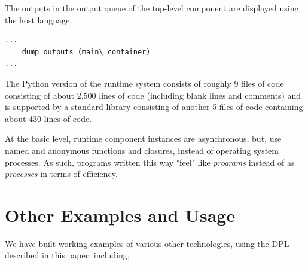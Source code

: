 \documentclass[10pt]{acmart}
\begin{document}
\begin{enumerate}
The outputs in the output queue of the top-level component are displayed
using the host language.

\begin{verbatim}
...
    dump_outputs (main\_container)
...
\end{verbatim}
  
\end{enumerate}

The Python version of the runtime system consists of roughly 9 files of
code consisting of about 2,500 lines of code (including blank lines and
comments) and is supported by a standard library consisting of another 5
files of code containing about 430 lines of code.

At the basic level, runtime component instances are asynchronous, but,
use named and anonymous functions and closures, instead of operating
system processes. As such, programs written this way "feel" like
\emph{programs} instead of as \emph{processes} in terms of efficiency.

\section{Other Examples and Usage}
We have built working examples of various other technologies, using the
DPL described in this paper, including,
\end{document}
